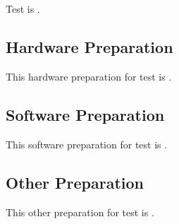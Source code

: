
\section{\StsTestID}
\label{loc:Prep\StsTestID}


Test \StsTestID{} is \TBD.

\subsection{Hardware Preparation}
\label{loc:HardwarePrep\StsTestID}


This hardware preparation for test \StsTestID{} is \TBD.

\subsection{Software Preparation}
\label{loc:SoftwarePrep\StsTestID}


This software preparation for test \StsTestID{} is \TBD.

\subsection{Other Preparation}
\label{loc:OtherPrep\StsTestID}


This other preparation for test \StsTestID{} is \TBD.
